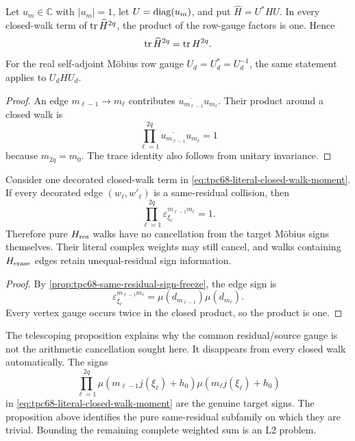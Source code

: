 \begin{proposition}
\label{prop:tpc68-gauge-telescoping}
Let \(u_m\in\mathbb C\) with \(|u_m|=1\), let
\(U=\operatorname{diag}(u_m)\), and put \(\widehat H=U^*HU\).  In every closed-walk term
of \(\operatorname{tr}\widehat H^{2q}\), the product of the row-gauge factors is one.
Hence
\[
 \operatorname{tr}\widehat H^{2q}=\operatorname{tr} H^{2q}.
\]
For the real self-adjoint M\"obius row gauge \(U_d=U_d^*=U_d^{-1}\), the
same statement applies to \(U_dHU_d\).
\end{proposition}

\begin{proof}
An edge \(m_{\ell-1}\to m_\ell\) contributes
\(\overline{u_{m_{\ell-1}}}u_{m_\ell}\).  Their product around a closed
walk is
\[
 \prod_{\ell=1}^{2q}
 \overline{u_{m_{\ell-1}}}u_{m_\ell}=1
\]
because \(m_{2q}=m_0\).  The trace identity also follows from unitary
invariance.
\end{proof}

\begin{proposition}
\label{prop:tpc68-pure-residual-walk-sign}
Consider one decorated closed-walk term in
\eqref{eq:tpc68-literal-closed-walk-moment}.  If every decorated edge
\((w_\ell,w'_\ell)\) is a same-residual collision, then
\begin{equation}
 \prod_{\ell=1}^{2q}
 \varepsilon_{\xi_\ell}^{m_{\ell-1}m_\ell}=1.
 \label{eq:tpc68-pure-residual-sign-product}
\end{equation}
Therefore pure \(H_{\rm res}\) walks have no cancellation from the target
M\"obius signs themselves.  Their literal complex weights may still
cancel, and walks containing \(H_{\rm erase}\) edges retain
unequal-residual sign information.
\end{proposition}

\begin{proof}
By \cref{prop:tpc68-same-residual-sign-freeze}, the edge sign is
\[
 \varepsilon_{\xi_\ell}^{m_{\ell-1}m_\ell}
 =\mu(d_{m_{\ell-1}})\mu(d_{m_\ell}).
\]
Every vertex gauge occurs twice in the closed product, so the product is
one.
\end{proof}

The telescoping proposition explains why the common residual/source gauge
is not the arithmetic cancellation sought here.  It disappears from every
closed walk automatically.  The signs
\[
 \prod_{\ell=1}^{2q}
 \mu(m_{\ell-1}j(\xi_\ell)+h_0)
 \mu(m_\ell j(\xi_\ell)+h_0)
\]
in \eqref{eq:tpc68-literal-closed-walk-moment} are the genuine target
signs.  The proposition above identifies the pure same-residual subfamily
on which they are trivial.  Bounding the remaining complete weighted sum
is an L2 problem.

